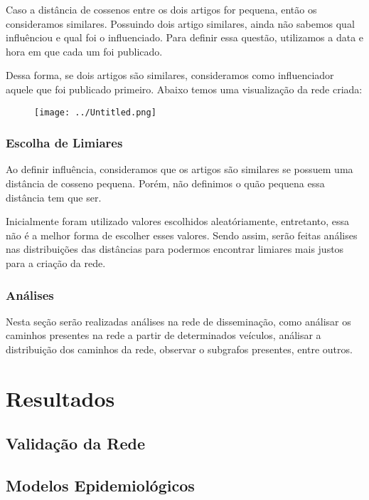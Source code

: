 \documentclass[a4paper,12pt]{article}
\begin{document}
 Caso a distância de cossenos entre os dois artigos for pequena, então os consideramos similares. Possuindo dois artigo similares, ainda não
 sabemos qual influênciou e qual foi o influenciado. Para definir essa questão, utilizamos a data e hora em que cada um foi publicado.
 
 Dessa forma, se dois artigos são similares, consideramos como influenciador aquele que foi publicado primeiro. Abaixo temos uma visualização da
 rede criada:

 \begin{figure}[h]
 \centering
 \texttt{[image: ../Untitled.png]}
\end{figure}



 
\subsubsection{Escolha de Limiares}

 Ao definir influência, consideramos que os artigos são similares se possuem uma distância de cosseno pequena. Porém, não definimos
 o quão pequena essa distância tem que ser. 
 
 Inicialmente foram utilizado valores escolhidos aleatóriamente, entretanto, essa não é a melhor forma de escolher esses valores.
 Sendo assim, serão feitas análises nas distribuições das distâncias para podermos encontrar limiares mais justos para a criação da rede.
 
 
\subsubsection{Análises}

 Nesta seção serão realizadas análises na rede de disseminação, como análisar os caminhos presentes na rede a partir de determinados veículos, análisar
 a distribuição dos caminhos da rede, observar o subgrafos presentes, entre outros.
 
\section{Resultados}
 
\subsection{Validação da Rede}

\subsection{Modelos Epidemiológicos}
\end{document}
